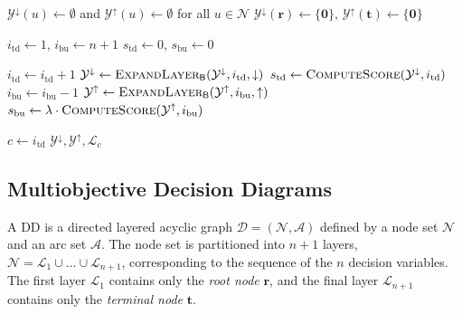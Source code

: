 \documentclass[letterpaper]{article}
\begin{document}
\begin{algorithm}[t!]
\begin{algorithmic}[1]
    \State
    $\mathcal{Y}^{\downarrow}(u)\gets\emptyset$ and
    $\mathcal{Y}^{\uparrow}(u)\gets\emptyset$
    for all $u\in\mathcal{N}$
    \State
    $\mathcal{Y}^{\downarrow}(\mathbf{r})\gets\{\mathbf{0}\}$,
    $\mathcal{Y}^{\uparrow}(\mathbf{t})\gets\{\mathbf{0}\}$

    \State
    $i_{\mathrm{td}}\gets 1$,
    $i_{\mathrm{bu}}\gets n+1$
    \State
    $s_{\mathrm{td}}\gets 0$,
    $s_{\mathrm{bu}}\gets 0$

            \State $i_{\mathrm{td}}\gets i_{\mathrm{td}}+1$
            \State
            $\mathcal{Y}^{\downarrow}
            \gets
            \Call{ExpandLayer$_{\mathsf{B}}$}
            {\mathcal{Y}^{\downarrow},
             i_{\mathrm{td}},
             \downarrow}$
            \State
            $s_{\mathrm{td}}
            \gets
            \Call{ComputeScore}
            {\mathcal{Y}^{\downarrow},i_{\mathrm{td}}}$
        \Else
            \State $i_{\mathrm{bu}}\gets i_{\mathrm{bu}}-1$
            \State
            $\mathcal{Y}^{\uparrow}
            \gets
            \Call{ExpandLayer$_{\mathsf{B}}$}
            {\mathcal{Y}^{\uparrow},
             i_{\mathrm{bu}},
             \uparrow}$
            \State
            $s_{\mathrm{bu}}
            \gets
            \lambda\cdot
            \Call{ComputeScore}
            {\mathcal{Y}^{\uparrow},i_{\mathrm{bu}}}$
        \EndIf
    \EndWhile

    \State $c\gets i_{\mathrm{td}}$
    \State \Return
    {$\mathcal{Y}^{\downarrow},
     \mathcal{Y}^{\uparrow},
     \mathcal{L}_c$}
\EndProcedure

\State \Return
{}
\end{algorithmic}
\end{algorithm}

\subsection{Multiobjective Decision Diagrams}
\label{sec:prelim_dd}

A DD is a directed layered acyclic graph $\mathcal{D} = (\mathcal{N}, \mathcal{A})$ defined by a node set $\mathcal{N}$ and an arc set $\mathcal{A}$. The node set is partitioned into $n+1$ layers, $\mathcal{N} = \mathcal{L}_1 \cup \dots \cup \mathcal{L}_{n+1}$, corresponding to the sequence of the $n$ decision variables. The first layer $\mathcal{L}_1$ contains only the \emph{root node} $\mathbf{r}$, and the final layer $\mathcal{L}_{n+1}$ contains only the \emph{terminal node} $\mathbf{t}$.
\end{document}
